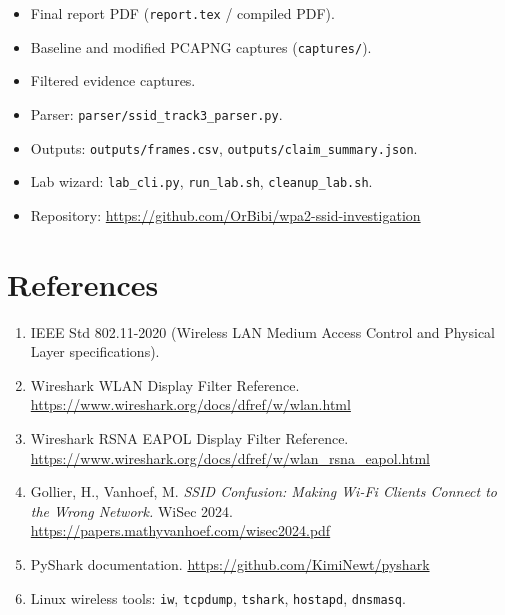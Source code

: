 \documentclass[12pt,a4paper]{article}
\begin{document}
\begin{itemize}
    \item Final report PDF (\texttt{report.tex} / compiled PDF).
    \item Baseline and modified PCAPNG captures (\texttt{captures/}).
    \item Filtered evidence captures.
    \item Parser: \texttt{parser/ssid\_track3\_parser.py}.
    \item Outputs: \texttt{outputs/frames.csv}, \texttt{outputs/claim\_summary.json}.
    \item Lab wizard: \texttt{lab\_cli.py}, \texttt{run\_lab.sh}, \texttt{cleanup\_lab.sh}.
    \item Repository: \url{https://github.com/OrBibi/wpa2-ssid-investigation}
\end{itemize}

\section{References}

\begin{enumerate}
    \item IEEE Std 802.11-2020 (Wireless LAN Medium Access Control and Physical Layer specifications).
    \item Wireshark WLAN Display Filter Reference. \url{https://www.wireshark.org/docs/dfref/w/wlan.html}
    \item Wireshark RSNA EAPOL Display Filter Reference. \url{https://www.wireshark.org/docs/dfref/w/wlan_rsna_eapol.html}
    \item Gollier, H., Vanhoef, M. \textit{SSID Confusion: Making Wi-Fi Clients Connect to the Wrong Network.} WiSec 2024. \url{https://papers.mathyvanhoef.com/wisec2024.pdf}
    \item PyShark documentation. \url{https://github.com/KimiNewt/pyshark}
    \item Linux wireless tools: \texttt{iw}, \texttt{tcpdump}, \texttt{tshark}, \texttt{hostapd}, \texttt{dnsmasq}.
\end{enumerate}
\end{document}
